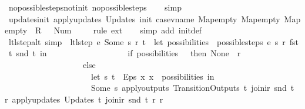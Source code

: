 \begin{isabellebody}
\isamarkupfalse%
\ no{\isacharunderscore}possible{\isacharunderscore}steps{\isacharunderscore}not{\isacharunderscore}init\ no{\isacharunderscore}possible{\isacharunderscore}steps\isanewline
\ \ \isamarkupfalse%
\ simp%
\endisatagproof
{\isafoldproof}%
%
\isadelimproof
\isanewline
%
\endisadelimproof
\isanewline
{}\isamarkupfalse%
\ updates{\isacharunderscore}init{\isacharcolon}\ {\isachardoublequoteopen}apply{\isacharunderscore}updates\ {\isacharparenleft}Updates\ init{\isacharparenright}\ {\isacharparenleft}case{\isacharunderscore}vname\ Map{\isachardot}empty\ Map{\isachardot}empty{\isacharparenright}\ Map{\isachardot}empty\ {\isacharequal}\ {\isacharless}R\ {}\ {\isacharcolon}{\isacharequal}\ Num\ {}{\isachargreater}{\isachardoublequoteclose}\isanewline
%
\isadelimproof
\ \ %
\endisadelimproof
%
\isatagproof
{}\isamarkupfalse%
\ {\isacharparenleft}rule\ ext{\isacharparenright}\isanewline
\ \ \isamarkupfalse%
\ {\isacharparenleft}simp\ add{\isacharcolon}\ init{\isacharunderscore}def{\isacharparenright}%
\endisatagproof
{\isafoldproof}%
%
\isadelimproof
\isanewline
%
\endisadelimproof
\isanewline
{}\isamarkupfalse%
\ ltl{\isacharunderscore}step{\isacharunderscore}alt\ {\isacharbrackleft}simp{\isacharbrackright}{\isacharcolon}\ \ {\isachardoublequoteopen}ltl{\isacharunderscore}step\ e\ {\isacharparenleft}Some\ s{\isacharparenright}\ r\ t\ {\isacharequal}\ {\isacharparenleft}let\ possibilities\ {\isacharequal}\ possible{\isacharunderscore}steps\ e\ s\ r\ {\isacharparenleft}fst\ t{\isacharparenright}\ {\isacharparenleft}snd\ t{\isacharparenright}\ in\isanewline
\ \ \ \ \ \ \ \ \ \ \ \ \ \ \ \ \ \ \ if\ possibilities\ {\isacharequal}\ {\isacharbraceleft}{\isacharbar}{\isacharbar}{\isacharbraceright}\ then\ {\isacharparenleft}None{\isacharcomma}\ {\isacharbrackleft}{\isacharbrackright}{\isacharcomma}\ r{\isacharparenright}\isanewline
\ \ \ \ \ \ \ \ \ \ \ \ \ \ \ \ \ \ \ else\isanewline
\ \ \ \ \ \ \ \ \ \ \ \ \ \ \ \ \ \ \ \ \ let\ {\isacharparenleft}s{\isacharprime}{\isacharcomma}\ t{\isacharprime}{\isacharparenright}\ {\isacharequal}\ Eps\ {\isacharparenleft}{\isasymlambda}x{\isachardot}\ x\ {\isacharbar}{\isasymin}{\isacharbar}\ possibilities{\isacharparenright}\ in\isanewline
\ \ \ \ \ \ \ \ \ \ \ \ \ \ \ \ \ \ \ \ \ {\isacharparenleft}Some\ s{\isacharprime}{\isacharcomma}\ {\isacharparenleft}apply{\isacharunderscore}outputs\ {\isacharparenleft}Transition{\isachardot}Outputs\ t{\isacharprime}{\isacharparenright}\ {\isacharparenleft}join{\isacharunderscore}ir\ {\isacharparenleft}snd\ t{\isacharparenright}\ r{\isacharparenright}{\isacharparenright}{\isacharcomma}\ {\isacharparenleft}apply{\isacharunderscore}updates\ {\isacharparenleft}Updates\ t{\isacharprime}{\isacharparenright}\ {\isacharparenleft}join{\isacharunderscore}ir\ {\isacharparenleft}snd\ t{\isacharparenright}\ r{\isacharparenright}\ r{\isacharparenright}{\isacharparenright}\isanewline

\end{isabellebody}

